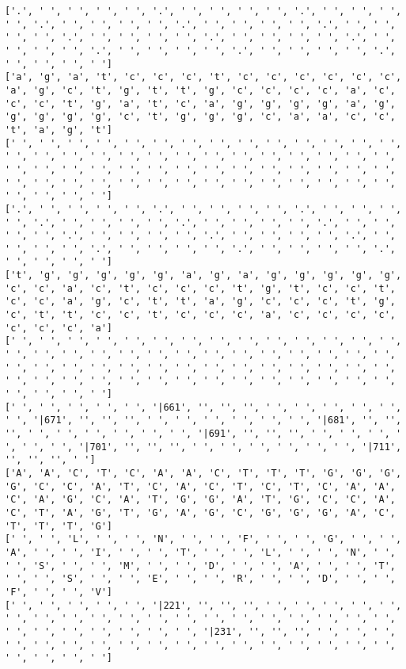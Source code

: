 \documentclass{article}
\begin{document}
\begin{Verbatim}
['.', ' ', ' ', ' ', ' ', '.', ' ', ' ', ' ', ' ', '.', ' ', ' ', ' ', ' ', '.', ' ', ' ', ' ', ' ', '.', ' ', ' ', ' ', ' ', '.', ' ', ' ', ' ', ' ', '.', ' ', ' ', ' ', ' ', '.', ' ', ' ', ' ', ' ', '.', ' ', ' ', ' ', ' ', '.', ' ', ' ', ' ', ' ', '.', ' ', ' ', ' ', ' ', '.', ' ', ' ', ' ', ' ']
['a', 'g', 'a', 't', 'c', 'c', 'c', 't', 'c', 'c', 'c', 'c', 'c', 'c', 'a', 'g', 'c', 't', 'g', 't', 't', 'g', 'c', 'c', 'c', 'c', 'a', 'c', 'c', 'c', 't', 'g', 'a', 't', 'c', 'a', 'g', 'g', 'g', 'g', 'a', 'g', 'g', 'g', 'g', 'g', 'c', 't', 'g', 'g', 'g', 'c', 'a', 'a', 'c', 'c', 't', 'a', 'g', 't']
[' ', ' ', ' ', ' ', ' ', ' ', ' ', ' ', ' ', ' ', ' ', ' ', ' ', ' ', ' ', ' ', ' ', ' ', ' ', ' ', ' ', ' ', ' ', ' ', ' ', ' ', ' ', ' ', ' ', ' ', ' ', ' ', ' ', ' ', ' ', ' ', ' ', ' ', ' ', ' ', ' ', ' ', ' ', ' ', ' ', ' ', ' ', ' ', ' ', ' ', ' ', ' ', ' ', ' ', ' ', ' ', ' ', ' ', ' ', ' ']
['.', ' ', ' ', ' ', ' ', '.', ' ', ' ', ' ', ' ', '.', ' ', ' ', ' ', ' ', '.', ' ', ' ', ' ', ' ', '.', ' ', ' ', ' ', ' ', '.', ' ', ' ', ' ', ' ', '.', ' ', ' ', ' ', ' ', '.', ' ', ' ', ' ', ' ', '.', ' ', ' ', ' ', ' ', '.', ' ', ' ', ' ', ' ', '.', ' ', ' ', ' ', ' ', '.', ' ', ' ', ' ', ' ']
['t', 'g', 'g', 'g', 'g', 'g', 'a', 'g', 'a', 'g', 'g', 'g', 'g', 'g', 'c', 'c', 'a', 'c', 't', 'c', 'c', 'c', 't', 'g', 't', 'c', 'c', 't', 'c', 'c', 'a', 'g', 'c', 't', 't', 'a', 'g', 'c', 'c', 'c', 't', 'g', 'c', 't', 't', 'c', 'c', 't', 'c', 'c', 'c', 'a', 'c', 'c', 'c', 'c', 'c', 'c', 'c', 'a']
[' ', ' ', ' ', ' ', ' ', ' ', ' ', ' ', ' ', ' ', ' ', ' ', ' ', ' ', ' ', ' ', ' ', ' ', ' ', ' ', ' ', ' ', ' ', ' ', ' ', ' ', ' ', ' ', ' ', ' ', ' ', ' ', ' ', ' ', ' ', ' ', ' ', ' ', ' ', ' ', ' ', ' ', ' ', ' ', ' ', ' ', ' ', ' ', ' ', ' ', ' ', ' ', ' ', ' ', ' ', ' ', ' ', ' ', ' ', ' ']
[' ', ' ', ' ', ' ', ' ', '|661', '', '', '', ' ', ' ', ' ', ' ', ' ', ' ', '|671', '', '', '', ' ', ' ', ' ', ' ', ' ', ' ', '|681', '', '', '', ' ', ' ', ' ', ' ', ' ', ' ', '|691', '', '', '', ' ', ' ', ' ', ' ', ' ', ' ', '|701', '', '', '', ' ', ' ', ' ', ' ', ' ', ' ', '|711', '', '', '', ' ']
['A', 'A', 'C', 'T', 'C', 'A', 'A', 'C', 'T', 'T', 'T', 'G', 'G', 'G', 'G', 'C', 'C', 'A', 'T', 'C', 'A', 'C', 'T', 'C', 'T', 'C', 'A', 'A', 'C', 'A', 'G', 'C', 'A', 'T', 'G', 'G', 'A', 'T', 'G', 'C', 'C', 'A', 'C', 'T', 'A', 'G', 'T', 'G', 'A', 'G', 'C', 'G', 'G', 'G', 'A', 'C', 'T', 'T', 'T', 'G']
[' ', ' ', 'L', ' ', ' ', 'N', ' ', ' ', 'F', ' ', ' ', 'G', ' ', ' ', 'A', ' ', ' ', 'I', ' ', ' ', 'T', ' ', ' ', 'L', ' ', ' ', 'N', ' ', ' ', 'S', ' ', ' ', 'M', ' ', ' ', 'D', ' ', ' ', 'A', ' ', ' ', 'T', ' ', ' ', 'S', ' ', ' ', 'E', ' ', ' ', 'R', ' ', ' ', 'D', ' ', ' ', 'F', ' ', ' ', 'V']
[' ', ' ', ' ', ' ', ' ', '|221', '', '', '', ' ', ' ', ' ', ' ', ' ', ' ', ' ', ' ', ' ', ' ', ' ', ' ', ' ', ' ', ' ', ' ', ' ', ' ', ' ', ' ', ' ', ' ', ' ', ' ', ' ', ' ', '|231', '', '', '', ' ', ' ', ' ', ' ', ' ', ' ', ' ', ' ', ' ', ' ', ' ', ' ', ' ', ' ', ' ', ' ', ' ', ' ', ' ', ' ', ' ']
  

\end{Verbatim}
\end{document}

